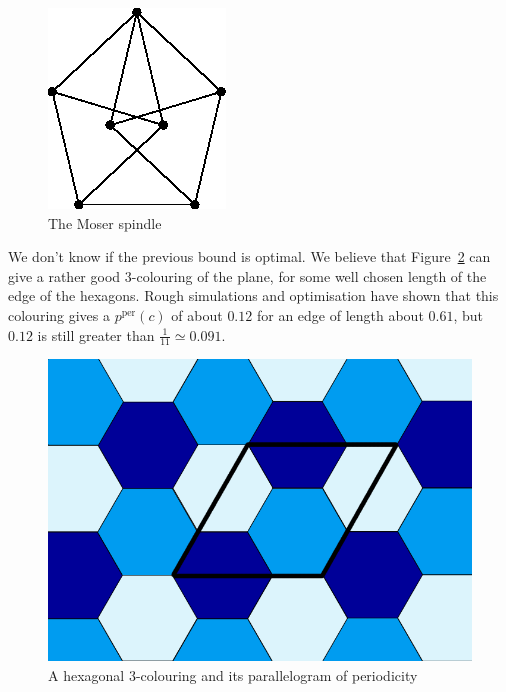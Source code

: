 \documentclass[a4paper,11pt]{article}
\theoremstyle{definition}
\theoremstyle{remark}
\newcommand{\pper}{p^{\mathrm{per}}}
\begin{document}
\begin{figure}[h]
\center
\includegraphics[scale=0.4]{T.png}
\caption{\label{color} The Moser spindle}
\end{figure}

We don't know if the previous bound is optimal. We believe that Figure~\ref{trois} 
can give a rather good $3$-colouring of the plane, for some well chosen length 
of the edge of the hexagons. Rough simulations and optimisation have shown that 
this colouring gives a $\pper(c)$ of about $0.12$ for an edge of length about 
$0.61$, but $0.12$ is still greater than $\frac{1}{11} \simeq 0.091$.

\begin{figure}[h]
\center
\includegraphics[scale=0.5]{trois.png}
\caption{\label{trois} A hexagonal $3$-colouring and its parallelogram of periodicity}
\end{figure}
\end{document}
